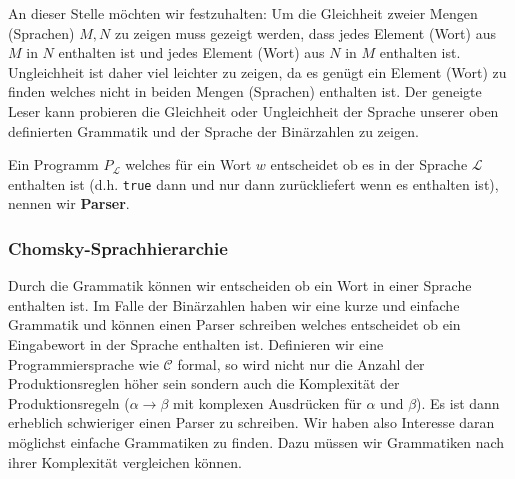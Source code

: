 An dieser Stelle möchten wir festzuhalten: Um die Gleichheit zweier Mengen (Sprachen) $M,N$ zu zeigen muss gezeigt werden, dass jedes Element (Wort) aus $M$ in $N$ enthalten ist
und jedes Element (Wort) aus $N$ in $M$ enthalten ist. Ungleichheit ist daher viel leichter zu zeigen, da es genügt ein Element (Wort) zu finden welches nicht in beiden Mengen (Sprachen) enthalten ist. Der geneigte Leser kann probieren die Gleichheit oder Ungleichheit der Sprache unserer oben definierten Grammatik und der Sprache der Binärzahlen zu zeigen.

\begin{defn}
Ein Programm $P_{\mathcal{L}}$ welches für ein Wort $w$ entscheidet ob es in der Sprache $\mathcal{L}$ enthalten ist (d.h. \verb|true| dann und nur dann zurückliefert wenn es enthalten ist), nennen wir \textbf{Parser}.
\end{defn}

\subsubsection{Chomsky-Sprachhierarchie}
Durch die Grammatik können wir entscheiden ob ein Wort in einer Sprache enthalten ist.
Im Falle der Binärzahlen haben wir eine kurze und einfache Grammatik und können einen Parser schreiben
welches entscheidet ob ein Eingabewort in der Sprache enthalten ist.
Definieren wir eine Programmiersprache wie $\mathcal{C}$ formal, so wird nicht nur die Anzahl der Produktionsreglen höher sein
sondern auch die Komplexität der Produktionsregeln ($\alpha \to \beta$ mit komplexen Ausdrücken für $\alpha$ und $\beta$).
Es ist dann erheblich schwieriger einen Parser zu schreiben.
Wir haben also Interesse daran möglichst einfache Grammatiken zu finden. Dazu müssen wir
Grammatiken nach ihrer Komplexität vergleichen können.

